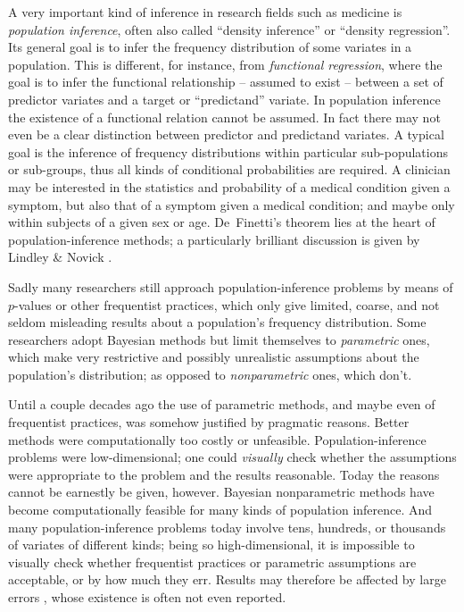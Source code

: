 \documentclass{article}
\begin{document}
A very important kind of inference in research fields such as medicine is \emph{population inference}, often also called ``density inference'' or ``density regression''. Its general goal is to infer the frequency distribution of some variates in a population. This is different, for instance, from \emph{functional regression}, where the goal is to infer the functional relationship -- assumed to exist -- between a set of predictor variates and a target or ``predictand'' variate. In population inference the existence of a functional relation cannot be assumed. In fact there may not even be a clear distinction between predictor and predictand variates. A typical goal is the inference of frequency distributions within particular sub-populations or sub-groups, thus all kinds of conditional probabilities are required. A clinician may be interested in the statistics and probability of a medical condition given a symptom, but also that of a symptom given a medical condition; and maybe only within subjects of a given sex or age. De~Finetti's theorem \citep[see e.g.][\S\S\,4.2, 4.3, 4.6]{bernardoetal1994_r2000} lies at the heart of population-inference methods; a particularly brilliant discussion is given by Lindley \& Novick \citeyearpar{lindleyetal1981}.

Sadly many researchers still approach population-inference problems by means of $p$-values or other frequentist practices, which only give limited, coarse, and not seldom misleading results about a population's frequency distribution. Some researchers adopt Bayesian methods but limit themselves to \emph{parametric} ones, which make very restrictive and possibly unrealistic assumptions about the population's distribution; as opposed to \emph{nonparametric} ones, which don't.

Until a couple decades ago the use of parametric methods, and maybe even of frequentist practices, was somehow justified by pragmatic reasons. Better methods were computationally too costly or unfeasible. Population-inference problems were low-dimensional; one could \emph{visually} check whether the assumptions were appropriate to the problem and the results reasonable. Today the reasons cannot be earnestly be given, however. Bayesian nonparametric methods have become computationally feasible for many kinds of population inference. And many population-inference problems today involve tens, hundreds, or thousands of variates of different kinds; being so high-dimensional, it is impossible to visually check whether frequentist practices or parametric assumptions are acceptable, or by how much they err. Results may therefore be affected by large errors \citep{draper1995}, whose existence is often not even reported.
\end{document}
